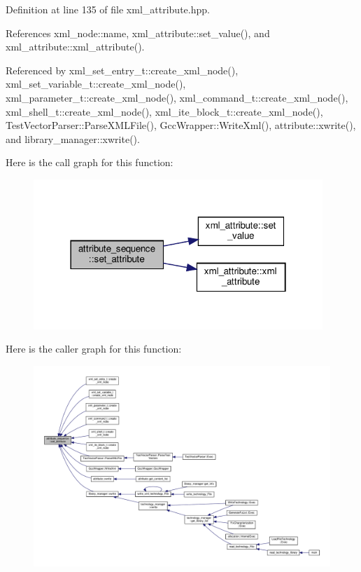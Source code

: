 Definition at line 135 of file xml\+\_\+attribute.\+hpp.



References xml\+\_\+node\+::name, xml\+\_\+attribute\+::set\+\_\+value(), and xml\+\_\+attribute\+::xml\+\_\+attribute().



Referenced by xml\+\_\+set\+\_\+entry\+\_\+t\+::create\+\_\+xml\+\_\+node(), xml\+\_\+set\+\_\+variable\+\_\+t\+::create\+\_\+xml\+\_\+node(), xml\+\_\+parameter\+\_\+t\+::create\+\_\+xml\+\_\+node(), xml\+\_\+command\+\_\+t\+::create\+\_\+xml\+\_\+node(), xml\+\_\+shell\+\_\+t\+::create\+\_\+xml\+\_\+node(), xml\+\_\+ite\+\_\+block\+\_\+t\+::create\+\_\+xml\+\_\+node(), Test\+Vector\+Parser\+::\+Parse\+X\+M\+L\+File(), Gcc\+Wrapper\+::\+Write\+Xml(), attribute\+::xwrite(), and library\+\_\+manager\+::xwrite().

Here is the call graph for this function\+:
\nopagebreak
\begin{figure}[H]
\begin{center}
\leavevmode
\includegraphics[width=310pt]{de/d33/structattribute__sequence_a980d8d0966c1af614141536566d9ed62_cgraph}
\end{center}
\end{figure}
Here is the caller graph for this function\+:
\nopagebreak
\begin{figure}[H]
\begin{center}
\leavevmode
\includegraphics[width=350pt]{de/d33/structattribute__sequence_a980d8d0966c1af614141536566d9ed62_icgraph}
\end{center}
\end{figure}



